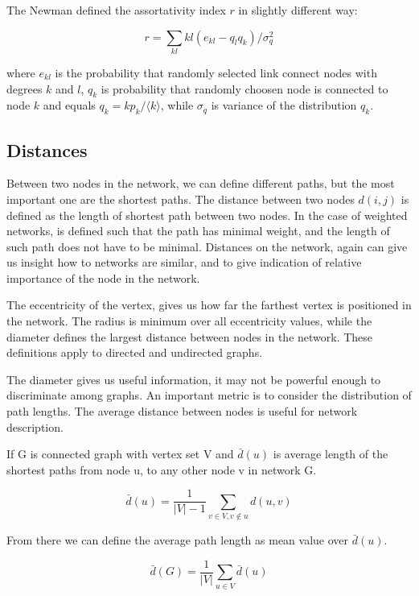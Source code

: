 The Newman defined the assortativity index $r$ in slightly different way:

\begin{equation}
r = \sum_{kl}kl(e_{kl} - q_lq_k) / \sigma_q^2
\end{equation}

where $e_{kl}$ is the probability that randomly selected link connect nodes with degrees $k$ and $l$, $q_k$ is probability that randomly choosen node is connected to node $k$ and equals $q_k = kp_k / \langle k \rangle$, while $\sigma_q$ is variance of the distribution $q_k$. 

\subsection{Distances}

Between two nodes in the network, we can define different paths, but the most important one are the shortest paths. The distance between two nodes $d(i, j)$ is defined as the length of shortest path between two nodes. 
In the case of weighted networks, is defined such that the path has minimal weight, and the length of such path does not have to be minimal. Distances on the network, again can give us insight how to networks are similar, and to give indication of relative importance of the node in the network. 

The eccentricity of the vertex, gives us how far the farthest vertex is positioned in the network. The radius is minimum over all eccentricity values, while the diameter defines the largest distance between nodes in the network. These definitions apply to directed and undirected graphs. 

The diameter gives us useful information, it may not be powerful enough to discriminate among graphs. An important metric is to consider the distribution of path lengths. The average distance between nodes is useful for network description. 

If G is connected graph with vertex set V and $\bar{d}(u)$ is average length of the shortest paths from node u, to any other node v in network G.

\begin{equation}
\bar{d}(u) = \frac{1}{|V|-1} \sum_{v\in V, v \notin u} d(u,v)  
\end{equation}

From there we can define the average path length as mean value over $\bar{d}(u)$.

\begin{equation}
\bar{d}(G) = \frac{1}{|V|}\sum_{u \in V} \bar{d}(u)
\end{equation}



